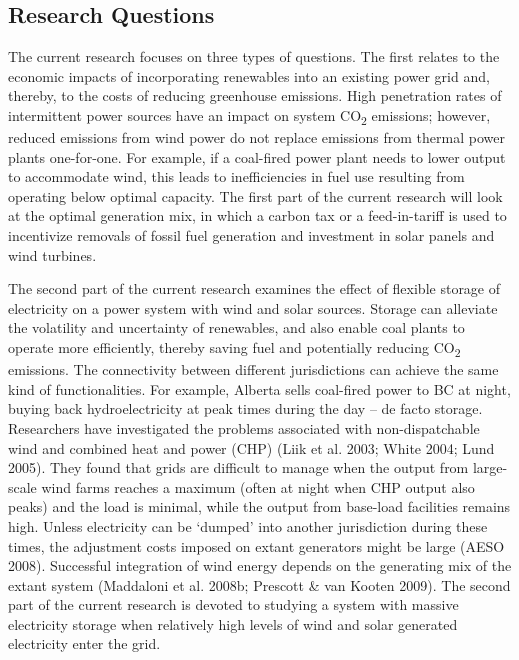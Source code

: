 \documentclass[10pt,letter]{article}
\begin{document}
\subsection{Research Questions}\label{research-questions}

The current research focuses on three types of questions. The first
relates to the economic impacts of incorporating renewables into an
existing power grid and, thereby, to the costs of reducing greenhouse
emissions. High penetration rates of intermittent power sources have an
impact on system CO\textsubscript{2} emissions; however, reduced
emissions from wind power do not replace emissions from thermal power
plants one-for-one. For example, if a coal-fired power plant needs to
lower output to accommodate wind, this leads to inefficiencies in fuel
use resulting from operating below optimal capacity. The first part of
the current research will look at the optimal generation mix, in which a
carbon tax or a feed-in-tariff is used to incentivize removals of fossil
fuel generation and investment in solar panels and wind turbines.

The second part of the current research examines the effect of flexible
storage of electricity on a power system with wind and solar sources.
Storage can alleviate the volatility and uncertainty of renewables, and
also enable coal plants to operate more efficiently, thereby saving fuel
and potentially reducing CO\textsubscript{2} emissions. The connectivity
between different jurisdictions can achieve the same kind of
functionalities. For example, Alberta sells coal-fired power to BC at
night, buying back hydroelectricity at peak times during the day -- de
facto storage. Researchers have investigated the problems associated
with non-dispatchable wind and combined heat and power (CHP) (Liik et
al. 2003; White 2004; Lund 2005). They found that grids are difficult to
manage when the output from large-scale wind farms reaches a maximum
(often at night when CHP output also peaks) and the load is minimal,
while the output from base-load facilities remains high. Unless
electricity can be `dumped' into another jurisdiction during these
times, the adjustment costs imposed on extant generators might be large
(AESO 2008). Successful integration of wind energy depends on the
generating mix of the extant system (Maddaloni et al. 2008b; Prescott \&
van Kooten 2009). The second part of the current research is devoted to
studying a system with massive electricity storage when relatively high
levels of wind and solar generated electricity enter the grid.
\end{document}
